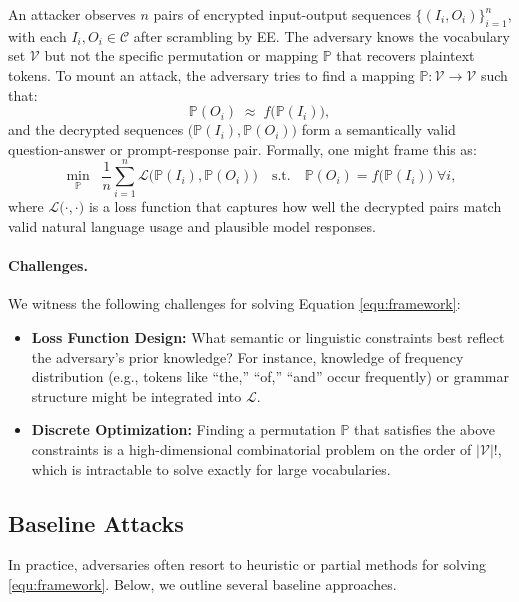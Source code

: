 \documentclass[10pt]{article}
\begin{document}
An attacker observes $n$ pairs of encrypted input-output sequences $\{(I_i,O_i)\}_{i=1}^n$, with each $I_i, O_i \in \mathcal{C}$ after scrambling by EE. The adversary knows the vocabulary set $\mathcal{V}$ but not the specific permutation or mapping $\mathbb{P}$ that recovers plaintext tokens. To mount an attack, the adversary tries to find a mapping $\mathbb{P}: \mathcal{V} \to \mathcal{V}$ such that:
\[
\mathbb{P}(O_i) \;\approx\; f\bigl(\mathbb{P}(I_i)\bigr), 
\]
and the decrypted sequences $\bigl(\mathbb{P}(I_i), \mathbb{P}(O_i)\bigr)$ form a semantically valid question-answer or prompt-response pair. Formally, one might frame this as:
\begin{equation}
\label{equ:framework}
    \min_{\mathbb{P}} \;\;\frac{1}{n}\sum_{i=1}^n \mathcal{L}\bigl(\mathbb{P}(I_i),\mathbb{P}(O_i)\bigr)
    \quad 
    \text{s.t.}
    \quad 
    \mathbb{P}(O_i)=f\bigl(\mathbb{P}(I_i)\bigr)\; \forall i,
\end{equation}
where $\mathcal{L}\bigl(\cdot,\cdot\bigr)$ is a loss function that captures how well the decrypted pairs match valid natural language usage and plausible model responses.

\paragraph{Challenges.} We witness the following challenges for solving Equation \eqref{equ:framework}:
\begin{itemize}
    \item \textbf{Loss Function Design:} What semantic or linguistic constraints best reflect the adversary’s prior knowledge? For instance, knowledge of frequency distribution (e.g., tokens like “the,” “of,” “and” occur frequently) or grammar structure might be integrated into $\mathcal{L}$.
    \item \textbf{Discrete Optimization:} Finding a permutation $\mathbb{P}$ that satisfies the above constraints is a high-dimensional combinatorial problem on the order of $|\mathcal{V}|!$, which is intractable to solve exactly for large vocabularies.
\end{itemize}

\subsection{Baseline Attacks}
\label{subsec:baseline_attacks}

In practice, adversaries often resort to heuristic or partial methods for solving \eqref{equ:framework}. Below, we outline several baseline approaches.
\end{document}
